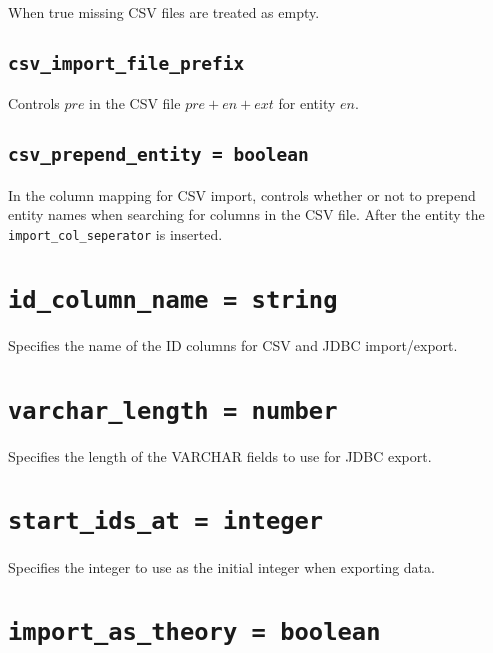\documentclass[10pt]{book}
\begin{document}
When true missing CSV files are treated as empty.

\subsection{{\tt csv\_import\_file\_prefix}}

Controls $pre$ in the CSV file $pre + en + ext$ for entity $en$.

\subsection{{\tt csv\_prepend\_entity = boolean}}

In the column mapping for CSV import, controls whether or not to prepend entity names when searching for columns in the CSV file.   After the entity the {\tt import\_col\_seperator} is inserted.

%

%
%
%
\section{{\tt id\_column\_name = string}}
Specifies the name of the ID columns for CSV and JDBC import/export.

\section{{\tt varchar\_length = number}}
Specifies the length of the VARCHAR fields to use for JDBC export.

\section{ {\tt start\_ids\_at = integer}}

Specifies the integer to use as the initial integer when exporting data.

\section{ {\tt import\_as\_theory = boolean}}
\end{document}
